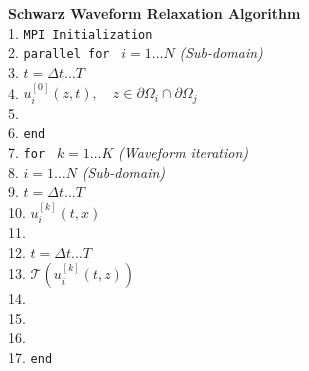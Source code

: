 \documentclass{svmult-ddm}
\begin{document}
\begin{table}[htbp]
\noindent\hrulefill
{\bf Schwarz Waveform Relaxation Algorithm} 
\hrulefill \\
1. {\tt MPI Initialization}\\
2. {\tt parallel for } $i = 1\ldots N$ {\em (Sub-domain)} \\
3. \quad{} $t = \Delta t \ldots T$ \\
4. \quad\quad\quad{} $u_i^{[0]}(z,t), \quad z \in \partial\Omega_i\cap\partial\Omega_j$\\
5. \quad{} \\
6. {\tt end} \\
7. {\tt for } $k=1 \ldots K$ {\em (Waveform iteration)}\\
8. \quad{} $i = 1\ldots N$ {\em (Sub-domain)}\\
9. \quad\quad\quad{} $t = \Delta t \ldots T$ \\
10.\quad\quad\quad\quad\quad{} $u_i^{[k]}(t, x)$ \\
11.\quad\quad\quad{} \\
12.\quad\quad\quad{} $t = \Delta t \ldots T$ \\
13.\quad\quad\quad\quad\quad{} $\mathcal{T}(u_i^{[k]}(t, z))$ \\
14.\quad\quad\quad{} \\
15.\quad\quad\quad{} \\
16.\quad{}\\
17. {\tt end} \\

\end{table}
\end{document}
